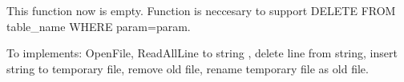 
\begin{DoxyRefList}
\item[Member \mbox{\hyperlink{classhelper_1_1_file_manager_a6b2ed7ad49524905359d08d5c95dc774}{helper::File\+Manager::delete\+Line}} (uint16\+\_\+t a\+\_\+u16\+Line\+Number)]\label{todo__todo000001}%
%
This function now is empty. Function is neccesary to support D\+E\+L\+E\+TE F\+R\+OM table\+\_\+name W\+H\+E\+RE param=param. 

To implements\+: Open\+File, Read\+All\+Line to string , delete line from string, insert string to temporary file, remove old file, rename temporary file as old file.
\end{DoxyRefList}